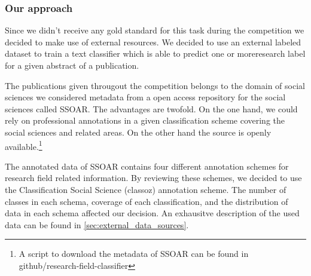\subsubsection{Our approach}
Since we didn't receive any gold standard for this task during the competition we decided to make use of external resources.
We decided to use an external labeled dataset to train a text classifier which is able to predict one or moreresearch label for a given abstract of a publication.

The publications given througout the competition belongs to the domain of social sciences we considered metadata from a open access repository for the social sciences called SSOAR.
The advantages are twofold.
On the one hand, we could rely on professional annotations in a given classification scheme covering the social sciences and related areas.
On the other hand the source is openly available.\footnote{A script to download the metadata of SSOAR can be found in github/research-field-classifier}

The annotated data of SSOAR contains four different annotation schemes for research field related information. By reviewing these schemes, we decided to use the Classification Social Science (classoz) annotation scheme. The number of classes in each schema, coverage of each classification, and the distribution of data in each schema affected our decision. 
An exhausitve description of the used data can be found in \ref{sec:external_data_sources}.

